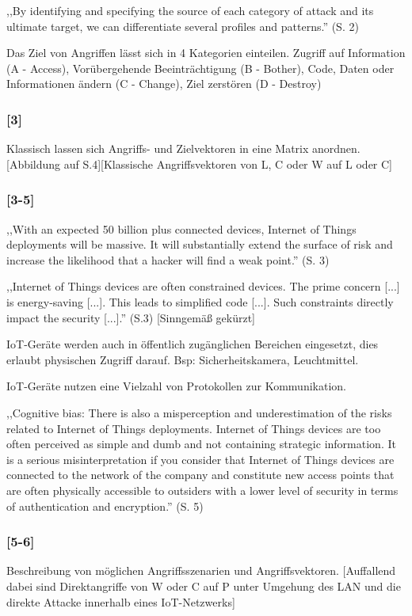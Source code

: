 \documentclass[11pt, a4paper, onecolumn, oneside, toc=bibliographynumbered, liststotoc]{scrartcl} %
\begin{document}
,,By identifying and specifying the source of each category of attack and its ultimate target, we can differentiate several profiles and patterns.'' (S. 2)

Das Ziel von Angriffen lässt sich in 4 Kategorien einteilen. Zugriff auf Information (A - Access), Vorübergehende Beeinträchtigung (B - Bother), Code, Daten oder Informationen ändern (C - Change), Ziel zerstören (D - Destroy)
		
			\subsubsection*{[3]}
Klassisch lassen sich Angriffs- und Zielvektoren in eine Matrix anordnen. [Abbildung auf S.4][Klassische Angriffsvektoren von L, C oder W auf L oder C]
		
			\subsubsection*{[3-5]}
,,With an expected 50 billion plus connected devices, Internet of Things deployments will be massive. It will substantially extend the surface of risk and increase the likelihood that a hacker will find a weak point.'' (S. 3)

,,Internet of Things devices are often constrained devices. The prime concern [...] is energy-saving [...]. This leads to simplified code [...]. Such constraints directly impact the security [...].'' (S.3) [Sinngemäß gekürzt]

IoT-Geräte werden auch in öffentlich zugänglichen Bereichen eingesetzt, dies erlaubt physischen Zugriff darauf. Bsp: Sicherheitskamera, Leuchtmittel.

IoT-Geräte nutzen eine Vielzahl von Protokollen zur Kommunikation. 

,,Cognitive bias: There is also a misperception and underestimation of the risks related to Internet of Things deployments. Internet of Things devices are too often perceived as simple and dumb and not containing strategic information. It is a serious misinterpretation if you consider that Internet of Things devices are connected to the network of the company and constitute new access points that are often physically accessible to outsiders with a lower level of security in terms of authentication and encryption.'' (S. 5)

			\subsubsection*{[5-6]}
Beschreibung von möglichen Angriffsszenarien und Angriffsvektoren. [Auffallend dabei sind Direktangriffe von W oder C auf P unter Umgehung des LAN und die direkte Attacke innerhalb eines IoT-Netzwerks]
\end{document}
